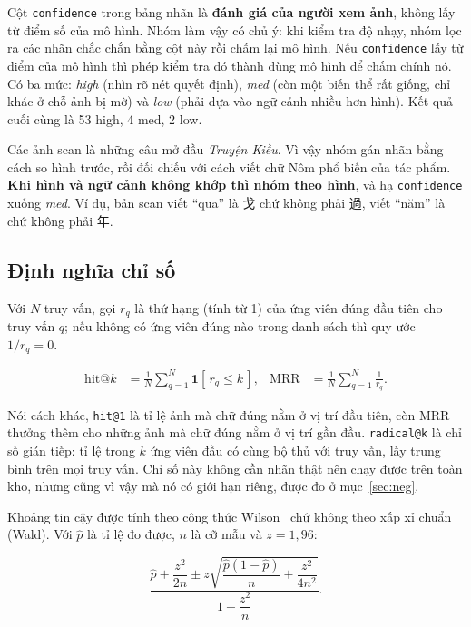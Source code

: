 \documentclass[conference,a4paper]{IEEEtran}
\newcommand{\nom}[1]{{\nomfont #1}}
\newcommand{\code}[1]{{\small\texttt{#1}}}
\begin{document}
Cột \code{confidence} trong bảng nhãn là \textbf{đánh giá của người xem ảnh}, không lấy từ điểm số
của mô hình. Nhóm làm vậy có chủ ý: khi kiểm tra độ nhạy, nhóm lọc ra các nhãn chắc chắn bằng cột này
rồi chấm lại mô hình. Nếu \code{confidence} lấy từ điểm của mô hình thì phép kiểm tra đó thành dùng
mô hình để chấm chính nó. Có ba mức: \emph{high} (nhìn rõ nét quyết định), \emph{med} (còn một biến
thể rất giống, chỉ khác ở chỗ ảnh bị mờ) và \emph{low} (phải dựa vào ngữ cảnh nhiều hơn hình). Kết
quả cuối cùng là 53 high, 4 med, 2 low.

Các ảnh scan là những câu mở đầu \emph{Truyện Kiều}. Vì vậy nhóm gán nhãn bằng cách so hình trước,
rồi đối chiếu với cách viết chữ Nôm phổ biến của tác phẩm. \textbf{Khi hình và ngữ cảnh không khớp
thì nhóm theo hình}, và hạ \code{confidence} xuống \emph{med}. Ví dụ, bản scan viết ``qua'' là
\nom{戈} chứ không phải \nom{過}, viết ``năm'' là \nom{𢆥} chứ không phải \nom{年}.

\subsection{Định nghĩa chỉ số}

Với $N$ truy vấn, gọi $r_q$ là thứ hạng (tính từ 1) của ứng viên đúng đầu tiên cho truy vấn $q$; nếu
không có ứng viên đúng nào trong danh sách thì quy ước $1/r_q = 0$.

\begin{align}
\text{hit@}k &= \frac{1}{N}\sum_{q=1}^{N} \mathbf{1}[\,r_q \leq k\,],
& \text{MRR} &= \frac{1}{N}\sum_{q=1}^{N} \frac{1}{r_q}.
\end{align}

Nói cách khác, \code{hit@1} là tỉ lệ ảnh mà chữ đúng nằm ở vị trí đầu tiên, còn MRR thưởng thêm cho
những ảnh mà chữ đúng nằm ở vị trí gần đầu. \code{radical@k} là chỉ số gián tiếp: tỉ lệ trong $k$ ứng
viên đầu có cùng bộ thủ với truy vấn, lấy trung bình trên mọi truy vấn. Chỉ số này không cần nhãn
thật nên chạy được trên toàn kho, nhưng cũng vì vậy mà nó có giới hạn riêng, được đo ở
mục~\ref{sec:neg}.

Khoảng tin cậy được tính theo công thức Wilson~\cite{wilson} chứ không theo xấp xỉ chuẩn (Wald). Với
$\hat{p}$ là tỉ lệ đo được, $n$ là cỡ mẫu và $z = 1{,}96$:

\begin{equation}
\label{eq:wilson}
\frac{\hat{p} + \dfrac{z^2}{2n} \pm z\sqrt{\dfrac{\hat{p}(1-\hat{p})}{n} + \dfrac{z^2}{4n^2}}}
     {1 + \dfrac{z^2}{n}} .
\end{equation}
\end{document}
